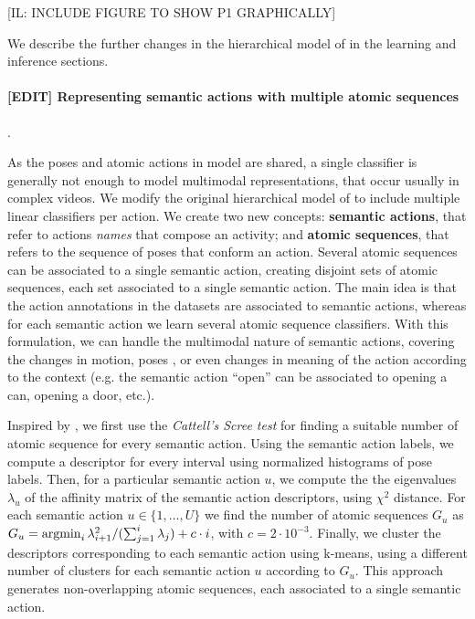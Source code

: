 [IL: INCLUDE  FIGURE TO SHOW P1 GRAPHICALLY]

We describe the further changes in the hierarchical model of \cite{Lillo2014} in the learning and inference sections.
  \paragraph{[EDIT] Representing semantic actions with multiple atomic sequences}.


As the poses and atomic actions in \cite{Lillo2014} model are shared, a single classifier is generally not enough to model multimodal representations, that occur usually in  complex videos. We modify the original hierarchical model of \cite{Lillo2014} to include multiple linear classifiers per action. We create two new concepts: \textbf{semantic actions}, that refer to actions \emph{names} that compose an activity; and \textbf{atomic sequences}, that refers to the sequence of poses that conform an action. Several atomic sequences can be associated to a single semantic action, creating disjoint sets of atomic sequences, each set associated to a single semantic action.  The main idea is that the action annotations in the datasets are associated to semantic actions, whereas for each semantic action we learn several atomic sequence classifiers. With this formulation, we can handle the multimodal nature of semantic actions, covering the changes in motion, poses , or even changes in meaning of the action according to the context (e.g. the semantic action ``open'' can be associated to opening a can, opening a door, etc.). 

Inspired by \cite{Raptis2012}, we first use the \emph{Cattell's Scree test} for finding a suitable number of atomic sequence for every semantic action. Using the semantic action labels, we compute a descriptor for every interval using normalized histograms of pose labels. Then, for a particular semantic action $u$, we compute the the eigenvalues $\lambda_u$ of the affinity matrix of the semantic action descriptors, using $\chi^2$ distance. For each semantic action $u \in \{1,\dots,U\}$ we find the number of atomic sequences $G_u$ as $G_u = \operatorname*{argmin}_i \lambda_{i+1}^2 / (\sum_{j=1}^i \lambda_j) + c\cdot i$, with $c=2\cdot 10^{-3}$. Finally, we cluster the descriptors corresponding to each semantic action using k-means, using a different number of clusters for each semantic action $u$ according to $G_u$. This approach generates non-overlapping atomic sequences, each associated to a single semantic action.

